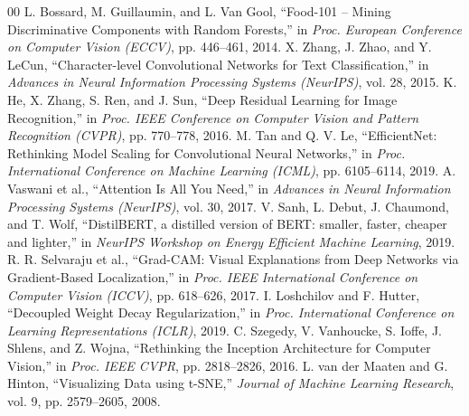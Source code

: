 \documentclass[conference]{IEEEtran}
\begin{document}
\begin{thebibliography}{00}
 L. Bossard, M. Guillaumin, and L. Van Gool, ``Food-101 -- Mining Discriminative Components with Random Forests,'' in \textit{Proc. European Conference on Computer Vision (ECCV)}, pp. 446--461, 2014.
 X. Zhang, J. Zhao, and Y. LeCun, ``Character-level Convolutional Networks for Text Classification,'' in \textit{Advances in Neural Information Processing Systems (NeurIPS)}, vol. 28, 2015.
 K. He, X. Zhang, S. Ren, and J. Sun, ``Deep Residual Learning for Image Recognition,'' in \textit{Proc. IEEE Conference on Computer Vision and Pattern Recognition (CVPR)}, pp. 770--778, 2016.
 M. Tan and Q. V. Le, ``EfficientNet: Rethinking Model Scaling for Convolutional Neural Networks,'' in \textit{Proc. International Conference on Machine Learning (ICML)}, pp. 6105--6114, 2019.
 A. Vaswani et al., ``Attention Is All You Need,'' in \textit{Advances in Neural Information Processing Systems (NeurIPS)}, vol. 30, 2017.
 V. Sanh, L. Debut, J. Chaumond, and T. Wolf, ``DistilBERT, a distilled version of BERT: smaller, faster, cheaper and lighter,'' in \textit{NeurIPS Workshop on Energy Efficient Machine Learning}, 2019.
 R. R. Selvaraju et al., ``Grad-CAM: Visual Explanations from Deep Networks via Gradient-Based Localization,'' in \textit{Proc. IEEE International Conference on Computer Vision (ICCV)}, pp. 618--626, 2017.
 I. Loshchilov and F. Hutter, ``Decoupled Weight Decay Regularization,'' in \textit{Proc. International Conference on Learning Representations (ICLR)}, 2019.
 C. Szegedy, V. Vanhoucke, S. Ioffe, J. Shlens, and Z. Wojna, ``Rethinking the Inception Architecture for Computer Vision,'' in \textit{Proc. IEEE CVPR}, pp. 2818--2826, 2016.
 L. van der Maaten and G. Hinton, ``Visualizing Data using t-SNE,'' \textit{Journal of Machine Learning Research}, vol. 9, pp. 2579--2605, 2008.
\end{thebibliography}
\end{document}
